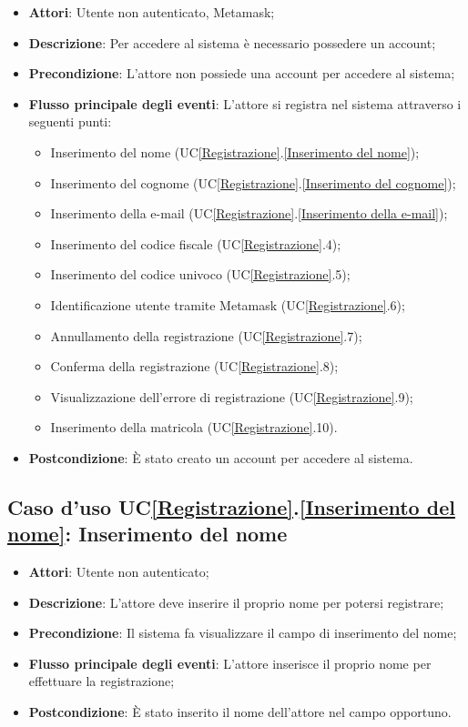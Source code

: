 \begin{itemize}
	\item \textbf{Attori}: Utente non autenticato, Metamask;
	\item \textbf{Descrizione}: Per accedere al sistema è necessario possedere un account;
	\item \textbf{Precondizione}: L'attore non possiede una account per accedere al sistema;
	\item \textbf{Flusso principale degli eventi}: L'attore si registra nel sistema attraverso i seguenti punti:
	\begin{itemize}
		\item Inserimento del nome (UC\ref{Registrazione}.\ref{Inserimento del nome});
		\item Inserimento del cognome (UC\ref{Registrazione}.\ref{Inserimento del cognome});
		\item Inserimento della e-mail (UC\ref{Registrazione}.\ref{Inserimento della e-mail});
		\item Inserimento del codice fiscale (UC\ref{Registrazione}.4);
		\item Inserimento del codice univoco (UC\ref{Registrazione}.5);
		\item Identificazione utente tramite Metamask (UC\ref{Registrazione}.6);
		\item Annullamento della registrazione (UC\ref{Registrazione}.7);
		\item Conferma della registrazione (UC\ref{Registrazione}.8);
		\item Visualizzazione dell'errore di registrazione (UC\ref{Registrazione}.9);
		\item Inserimento della matricola (UC\ref{Registrazione}.10).
	\end{itemize}
	\item \textbf{Postcondizione}: È stato creato un account per accedere al sistema.
\end{itemize}

\subsection{Caso d'uso UC\ref{Registrazione}.\ref{Inserimento del nome}: Inserimento del nome}
\begin{itemize}
	\item \textbf{Attori}: Utente non autenticato;
	\item \textbf{Descrizione}: L'attore deve inserire il proprio nome per potersi registrare;
	\item \textbf{Precondizione}: Il sistema fa visualizzare il campo di inserimento del nome;
	\item \textbf{Flusso principale degli eventi}: L'attore inserisce il proprio nome per effettuare la registrazione;
	\item \textbf{Postcondizione}: È stato inserito il nome dell'attore nel campo opportuno.
\end{itemize}

